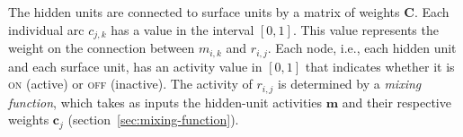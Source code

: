 %
%
%
The hidden units are connected to surface units by a matrix of weights $\mathbf{C}$. 
Each individual arc $c_{j,k}$ has a value in the interval $[0,1]$. This value 
represents the weight on the connection between $m_{i,k}$ and $r_{i,j}$.
Each node, i.e., each hidden unit and each surface unit, has an activity value in $[0,1]$ that
indicates whether it is \textsc{on} (active) or \textsc{off} (inactive).
The activity of $r_{i,j}$ is determined by a \emph{mixing function}, which takes as inputs the 
hidden-unit activities $\mathbf{m}$ and their respective weights $\mathbf{c}_j$
(section~\ref{sec:mixing-function}).

